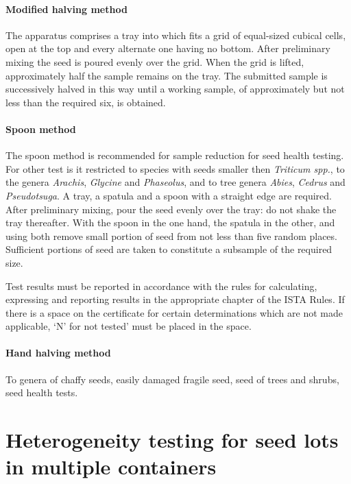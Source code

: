 \documentclass[
]{book}
\begin{document}
\hypertarget{modified-halving-method}{%
\paragraph{Modified halving method}\label{modified-halving-method}}

The apparatus comprises a tray into which fits a grid of equal-sized cubical cells, open at the top and every alternate one having no bottom. After preliminary mixing the seed is poured evenly over the grid. When the grid is lifted, approximately half the sample remains on the tray. The submitted sample is successively halved in this way until a working sample, of approximately but not less than the required six, is obtained.

\hypertarget{spoon-method}{%
\paragraph{Spoon method}\label{spoon-method}}

The spoon method is recommended for sample reduction for seed health testing. For other test is it restricted to species with seeds smaller then \emph{Triticum spp.}, to the genera \emph{Arachis}, \emph{Glycine} and \emph{Phaseolus}, and to tree genera \emph{Abies}, \emph{Cedrus} and \emph{Pseudotsuga}. A tray, a spatula and a spoon with a straight edge are required. After preliminary mixing, pour the seed evenly over the tray: do not shake the tray thereafter. With the spoon in the one hand, the spatula in the other, and using both remove small portion of seed from not less than five random places. Sufficient portions of seed are taken to constitute a subsample of the required size.

Test results must be reported in accordance with the rules for calculating, expressing and reporting results in the appropriate chapter of the ISTA Rules. If there is a space on the certificate for certain determinations which are not made applicable, `N' for not tested' must be placed in the space.

\hypertarget{hand-halving-method}{%
\paragraph{Hand halving method}\label{hand-halving-method}}

To genera of chaffy seeds, easily damaged fragile seed, seed of trees and shrubs, seed health tests.

\hypertarget{heterogeneity-testing-for-seed-lots-in-multiple-containers}{%
\section{Heterogeneity testing for seed lots in multiple containers}\label{heterogeneity-testing-for-seed-lots-in-multiple-containers}}
\end{document}
